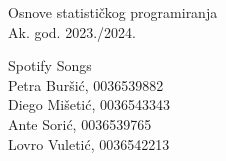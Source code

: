 \documentclass[12pt]{report}
\begin{document}
	\begin{titlepage}
		\begin{center}

	\LARGE Osnove statističkog programiranja\\
	\large Ak. god. 2023./2024.\\
	
	
	\huge Spotify Songs\\
	
	{\raggedleft
	\large  Petra Buršić, 0036539882\\
			Diego Mišetić, 0036543343\\
			Ante Sorić, 0036539765\\
			Lovro Vuletić, 0036542213\\
	}
		

		\end{center}	
	\end{titlepage}
	
	\tableofcontents
	
	
	
	
	
\end{document}

